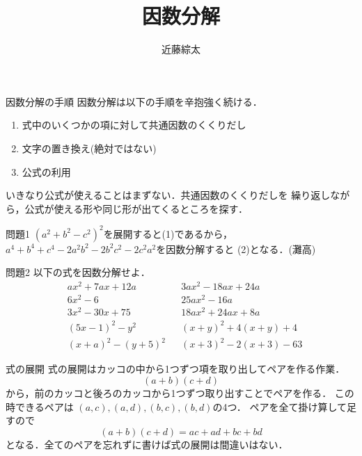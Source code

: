 \documentclass[dvipdfmx]{beamer}
\title{因数分解}
\author{近藤綜太}
\begin{document}
\maketitle
	\begin{frame}{因数分解の手順}
		因数分解は以下の手順を辛抱強く続ける．
		\begin{enumerate}
			\item 式中のいくつかの項に対して共通因数のくくりだし
			\item 文字の置き換え(絶対ではない)
			\item 公式の利用
		\end{enumerate}
		いきなり公式が使えることはまずない．共通因数のくくりだしを
		繰り返しながら，公式が使える形や同じ形が出てくるところを探す．
	\end{frame}


	\begin{frame}{問題1}
		$(a^2+b^2-c^2)^2$を展開すると(1)であるから，
		$a^4+b^4+c^4-2a^2b^2-2b^2c^2-2c^2a^2$を因数分解すると
		(2)となる．(灘高)
	\end{frame}

	\begin{frame}{問題2}
		以下の式を因数分解せよ．
		\begin{align*}
			&ax^2+7ax+12a & &3ax^2-18ax+24a\\
			&6x^2-6 & &25ax^2-16a\\
			&3x^2-30x+75 & &18ax^2+24ax+8a\\
			&(5x-1)^2 - y^2 & &(x+y)^2+4(x+y)+4\\
			&(x+a)^2-(y+5)^2 & &(x+3)^2-2(x+3)-63
		\end{align*}
	\end{frame}



\begin{frame}{式の展開}
	式の展開はカッコの中から1つずつ項を取り出してペアを作る作業．
	\[(a+b)(c+d)\]
	から，前のカッコと後ろのカッコから1つずつ取り出すことでペアを作る．
	この時できるペアは $(a, c), (a, d), (b, c), (b, d)$の4つ．
	ペアを全て掛け算して足すので
	\[(a+b)(c+d)=ac+ad+bc+bd\]
	となる．全てのペアを忘れずに書けば式の展開は間違いはない．
\end{frame}
\end{document}
